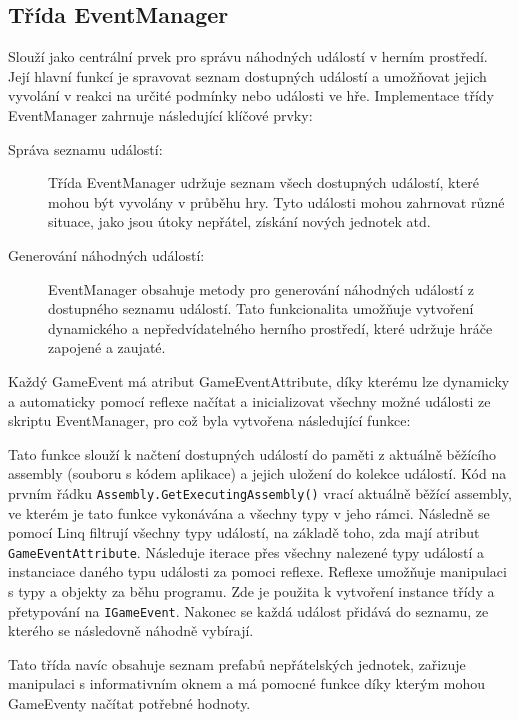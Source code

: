 \subsection{Třída EventManager}
Slouží jako centrální prvek pro správu náhodných událostí v herním prostředí. Její hlavní funkcí je spravovat seznam dostupných událostí a umožňovat jejich vyvolání v reakci na určité podmínky nebo události ve hře. Implementace třídy EventManager zahrnuje následující klíčové prvky:

\begin{description}
	\item[Správa seznamu událostí:] Třída EventManager udržuje seznam všech dostupných událostí, které mohou být vyvolány v průběhu hry. Tyto události mohou zahrnovat různé situace, jako jsou útoky nepřátel, získání nových jednotek atd.
	\item[Generování náhodných událostí:] EventManager obsahuje metody pro generování náhodných událostí z dostupného seznamu událostí. Tato funkcionalita umožňuje vytvoření dynamického a nepředvídatelného herního prostředí, které udržuje hráče zapojené a zaujaté.
\end{description}

Každý GameEvent má atribut GameEventAttribute, díky kterému lze dynamicky a automaticky pomocí reflexe načítat a inicializovat všechny možné události ze skriptu EventManager, pro což byla vytvořena následující funkce:

Tato funkce slouží k načtení dostupných událostí do paměti z aktuálně běžícího assembly (souboru s kódem aplikace) a jejich uložení do kolekce událostí. Kód na prvním řádku \texttt{Assembly.GetExecutingAssembly()} vrací aktuálně běžící assembly, ve kterém je tato funkce vykonávána a všechny typy v jeho rámci. Následně se pomocí Linq filtrují všechny typy událostí, na základě toho, zda mají atribut \texttt{GameEventAttribute}. Následuje iterace přes všechny nalezené typy událostí a instanciace daného typu události za pomoci reflexe. Reflexe umožňuje manipulaci s typy a objekty za běhu programu. Zde je použita k vytvoření instance třídy a přetypování na \texttt{IGameEvent}. Nakonec se každá událost přidává do seznamu, ze kterého se následovně náhodně vybírají.

Tato třída navíc obsahuje seznam prefabů nepřátelských jednotek, zařizuje manipulaci s informativním oknem a má pomocné funkce díky kterým mohou GameEventy načítat potřebné hodnoty.

